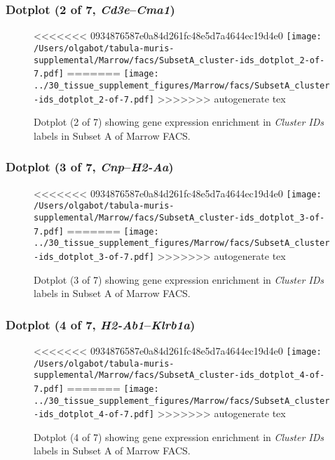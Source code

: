 \clearpage

\subsubsection{Dotplot (2 of 7, \emph{Cd3e}--\emph{Cma1})}
\begin{figure}[h]
\centering
<<<<<<< 0934876587e0a84d261fc48e5d7a4644ec19d4e0
\texttt{[image: /Users/olgabot/tabula-muris-supplemental/Marrow/facs/SubsetA\_cluster-ids\_dotplot\_2-of-7.pdf]}
=======
\texttt{[image: ../30\_tissue\_supplement\_figures/Marrow/facs/SubsetA\_cluster-ids\_dotplot\_2-of-7.pdf]}
>>>>>>> autogenerate tex

\caption{ Dotplot (2 of 7)  showing gene expression enrichment in \emph{Cluster IDs} labels in Subset A of Marrow FACS. }
\end{figure}


\clearpage

\subsubsection{Dotplot (3 of 7, \emph{Cnp}--\emph{H2-Aa})}
\begin{figure}[h]
\centering
<<<<<<< 0934876587e0a84d261fc48e5d7a4644ec19d4e0
\texttt{[image: /Users/olgabot/tabula-muris-supplemental/Marrow/facs/SubsetA\_cluster-ids\_dotplot\_3-of-7.pdf]}
=======
\texttt{[image: ../30\_tissue\_supplement\_figures/Marrow/facs/SubsetA\_cluster-ids\_dotplot\_3-of-7.pdf]}
>>>>>>> autogenerate tex

\caption{ Dotplot (3 of 7)  showing gene expression enrichment in \emph{Cluster IDs} labels in Subset A of Marrow FACS. }
\end{figure}


\clearpage

\subsubsection{Dotplot (4 of 7, \emph{H2-Ab1}--\emph{Klrb1a})}
\begin{figure}[h]
\centering
<<<<<<< 0934876587e0a84d261fc48e5d7a4644ec19d4e0
\texttt{[image: /Users/olgabot/tabula-muris-supplemental/Marrow/facs/SubsetA\_cluster-ids\_dotplot\_4-of-7.pdf]}
=======
\texttt{[image: ../30\_tissue\_supplement\_figures/Marrow/facs/SubsetA\_cluster-ids\_dotplot\_4-of-7.pdf]}
>>>>>>> autogenerate tex

\caption{ Dotplot (4 of 7)  showing gene expression enrichment in \emph{Cluster IDs} labels in Subset A of Marrow FACS. }
\end{figure}


